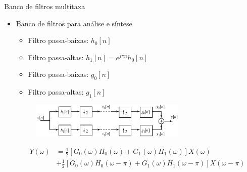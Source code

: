 \begin{slide}{Banco de filtros multitaxa}
	\begin{itemize}
		\item Banco de filtros para análise e síntese
			\begin{itemize}
				\item Filtro passa-baixas: $h_0[n]$
				\item Filtro passa-altas: $h_1[n] = e^{j\pi n}h_0[n]$
				\item Filtro passa-baixas: $g_0[n]$
				\item Filtro passa-altas: $g_1[n]$
			\end{itemize}
                        \begin{figure}
				\centering
				\includegraphics[width=0.7\textwidth]{figs/4-44.eps}
			\end{figure}
			\begin{align*}
				Y(\omega) &= \frac{1}{2}\left [ G_0(\omega)H_0(\omega)+G_1(\omega)H_1(\omega)\right ] X(\omega)\\
				          &+\frac{1}{2} \left [ G_0(\omega)H_0(\omega-\pi)+G_1(\omega)H_1(\omega-\pi)\right ] X(\omega-\pi)
					  \end{align*}

	\end{itemize}
\end{slide}

